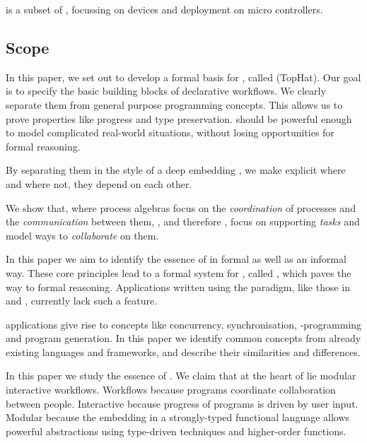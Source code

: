 \MTASKS is a subset of \ITASKS,
focussing on \IOT devices and deployment on micro controllers.




\subsection{Scope}


In this paper, we set out to develop a formal basis for \TOP, called \TOPHAT (TopHat).
Our goal is to specify the basic building blocks of declarative workflows.
We clearly separate them from general purpose programming concepts.
This allows us to prove properties like progress and type preservation.
\TOPHAT should be powerful enough to model complicated real-world situations,
without losing opportunities for formal reasoning.

By separating them in the style of a deep embedding \cite{conf/cefp/Gibbons13}, we make explicit where and where not, they depend on each other. 

We show that, where process algebras focus on the \emph{coordination} of processes and the \emph{communication} between them,
\TOP, and therefore \TOPHAT, focus on supporting \emph{tasks} and model ways to \emph{collaborate} on them.

In this paper we aim to identify the essence of \TOP in formal as well as an informal way.
These core principles lead to a formal system for \TOP, called \TOPHAT,
which paves the way to formal reasoning.
Applications written using the \TOP paradigm, like those in \ITASKS and \MTASKS, currently lack such a feature.

\TOP applications give rise to concepts like concurrency, synchronisation, \GUI-programming and program generation.
In this paper we identify common concepts from already existing languages and frameworks,
and describe their similarities and differences.

In this paper we study the essence of \TOP.
We claim that at the heart of \TOP lie modular interactive workflows.
Workflows because \TOP programs coordinate collaboration between people.
Interactive because progress of \TOP programs is driven by user input.
Modular because the embedding in a strongly-typed functional language allows powerful abstractions using type-driven techniques and higher-order functions.


